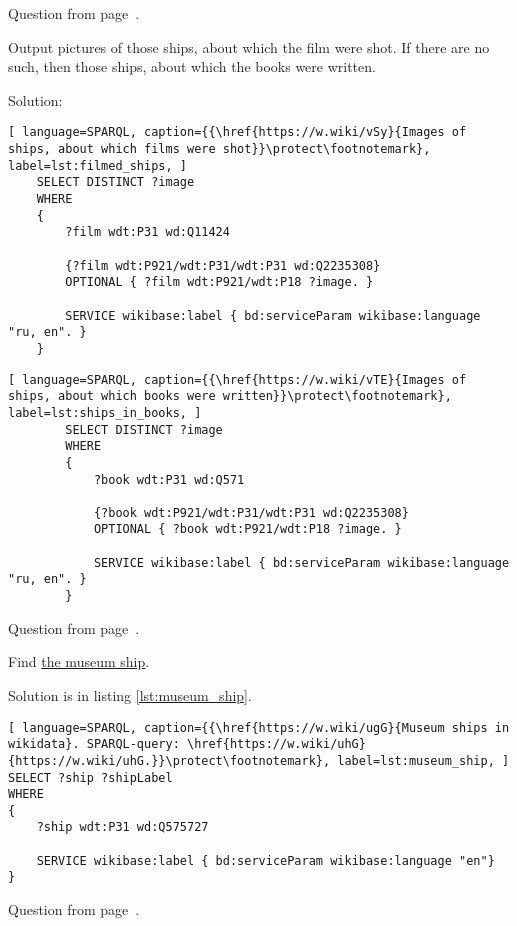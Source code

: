 \small{Question from page~\pageref{ship_tasks}.}


\begin{exercise}
	\label{answer:ship_ex_2}
	Output pictures of those ships, about which the film were shot. If there are no such, then those ships, about which the books were written.\\
\end{exercise}

Solution:
\begin{lstlisting}[ language=SPARQL, caption={{\href{https://w.wiki/vSy}{Images of ships, about which films were shot}}\protect\footnotemark}, label=lst:filmed_ships, ]
	SELECT DISTINCT ?image 
	WHERE
	{
		?film wdt:P31 wd:Q11424 
			  
		{?film wdt:P921/wdt:P31/wdt:P31 wd:Q2235308}
		OPTIONAL { ?film wdt:P921/wdt:P18 ?image. }
			
		SERVICE wikibase:label { bd:serviceParam wikibase:language "ru, en". }
	}
\end{lstlisting}


\begin{lstlisting}[ language=SPARQL, caption={{\href{https://w.wiki/vTE}{Images of ships, about which books were written}}\protect\footnotemark}, label=lst:ships_in_books, ]
		SELECT DISTINCT ?image
		WHERE
		{
			?book wdt:P31 wd:Q571
				  
			{?book wdt:P921/wdt:P31/wdt:P31 wd:Q2235308}
			OPTIONAL { ?book wdt:P921/wdt:P18 ?image. }
				
			SERVICE wikibase:label { bd:serviceParam wikibase:language "ru, en". }
		}
\end{lstlisting}

\small{Question from page~\pageref{ship_tasks}.}

		
	
\begin{exercise}
	\label{answer:ship_ex_3}
	Find \href{https://en.wikipedia.org/wiki/List_of_museum_ships}{the museum ship}.
\end{exercise}

Solution is in listing \ref{lst:museum_ship}.

\begin{lstlisting}[ language=SPARQL, caption={{\href{https://w.wiki/ugG}{Museum ships in wikidata}. SPARQL-query: \href{https://w.wiki/uhG}{https://w.wiki/uhG.}}\protect\footnotemark}, label=lst:museum_ship, ]
SELECT ?ship ?shipLabel
WHERE
{
	?ship wdt:P31 wd:Q575727
			   
	SERVICE wikibase:label { bd:serviceParam wikibase:language "en"}
}
\end{lstlisting}

\small{Question from page~\pageref{ship_tasks}.}